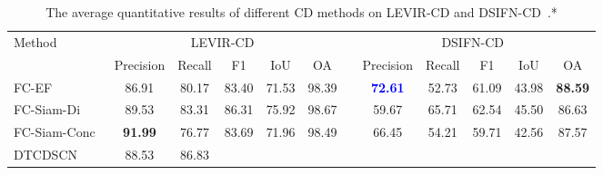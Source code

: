 \documentclass{article}
\begin{document}
\begin{table*}[htb]
    \caption{The average quantitative results of different CD methods on LEVIR-CD \cite{LEVIR} and DSIFN-CD~\cite{DSIFN}.*}
    \centering
    \begin{tabular}{lccccccccccc}
        \toprule
        \multirow{2}{*}{\centering Method} & \multicolumn{5}{c}{LEVIR-CD~\cite{LEVIR}} & & \multicolumn{5}{c}{DSIFN-CD~\cite{DSIFN}}\\
        \cmidrule{2-6} \cmidrule{8-12}
                            &       Precision & 
                                    Recall & 
                                    F1 & 
                                    IoU & 
                                    OA && 
                                    Precision & 
                                    Recall & 
                                    F1 & 
                                    IoU & 
                                    OA\\
        \toprule
        FC-EF~\cite{CD_FC} &        86.91 & 
                                    80.17 & 
                                    83.40 & 
                                    71.53 & 
                                    98.39 && 
                                    \textcolor{blue}{\bf 72.61} & 
                                    52.73 & 
                                    61.09 & 
                                    43.98 & 
                                    \bf 88.59\\
        FC-Siam-Di~\cite{CD_FC}     & 89.53 & 
                                    83.31 & 
                                    86.31 & 
                                    75.92 & 
                                    98.67 && 
                                    59.67 & 
                                    65.71 & 
                                    62.54 & 
                                    45.50 & 
                                    86.63\\
        FC-Siam-Conc~\cite{CD_FC}   & \bf 91.99 & 
                                    76.77 & 
                                    83.69 & 
                                    71.96 & 
                                    98.49 && 
                                    66.45 & 
                                    54.21 & 
                                    59.71 & 
                                    42.56 & 
                                    87.57\\
        DTCDSCN~\cite{CD_DTCDSCN}   & 88.53 & 
                                    86.83 & 

\end{tabular}
\end{table*}
\end{document}
